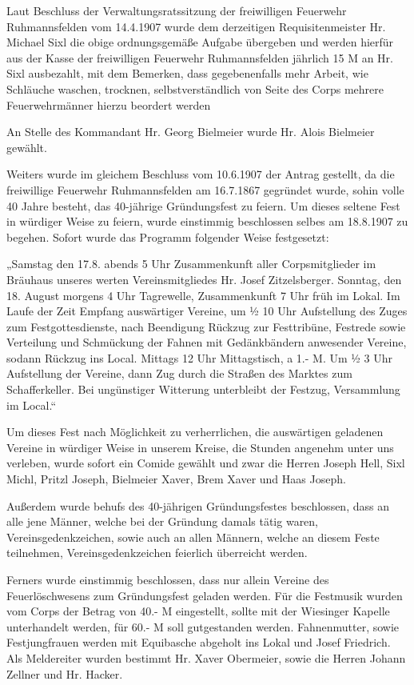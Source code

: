\documentclass[12pt,a4paper]{book}
\begin{document}
Laut Beschluss der Verwaltungsratssitzung der freiwilligen Feuerwehr
Ruhmannsfelden vom 14.4.1907 wurde dem derzeitigen Requisitenmeister Hr. Michael
Sixl die obige ordnungsgemäße Aufgabe übergeben und werden hierfür aus der Kasse
der freiwilligen Feuerwehr Ruhmannsfelden jährlich 15 M an Hr. Sixl ausbezahlt,
mit dem Bemerken, dass gegebenenfalls mehr Arbeit, wie Schläuche waschen,
trocknen, selbstverständlich von Seite des Corps mehrere Feuerwehrmänner hierzu
beordert werden

An Stelle des Kommandant Hr. Georg Bielmeier wurde Hr. Alois Bielmeier gewählt.

Weiters wurde im gleichem Beschluss vom 10.6.1907 der Antrag gestellt, da die
freiwillige Feuerwehr Ruhmannsfelden am 16.7.1867 gegründet wurde, sohin volle
40 Jahre besteht, das 40-jährige Gründungsfest zu feiern. Um dieses seltene Fest
in würdiger Weise zu feiern, wurde einstimmig beschlossen selbes am 18.8.1907 zu
begehen. Sofort wurde das Programm folgender Weise festgesetzt:

„Samstag den 17.8. abends 5 Uhr Zusammenkunft aller Corpsmitglieder im Bräuhaus
unseres werten Vereinsmitgliedes Hr. Josef Zitzelsberger. Sonntag, den 18.
August morgens 4 Uhr Tagrewelle, Zusammenkunft 7 Uhr früh im Lokal. Im Laufe der
Zeit Empfang auswärtiger Vereine, um ½ 10 Uhr Aufstellung des Zuges zum
Festgottesdienste, nach Beendigung Rückzug zur Festtribüne, Festrede sowie
Verteilung und Schmückung der Fahnen mit Gedänkbändern anwesender Vereine,
sodann Rückzug ins Local. Mittags 12 Uhr Mittagstisch, a 1.- M. Um ½ 3 Uhr
Aufstellung der Vereine, dann Zug durch die Straßen des Marktes zum
Schafferkeller. Bei ungünstiger Witterung unterbleibt der Festzug, Versammlung
im Local.“

Um dieses Fest nach Möglichkeit zu verherrlichen, die auswärtigen geladenen
Vereine in würdiger Weise in unserem Kreise, die Stunden angenehm unter uns
verleben, wurde sofort ein Comide gewählt und zwar die Herren Joseph Hell, Sixl
Michl, Pritzl Joseph, Bielmeier Xaver, Brem Xaver und Haas Joseph.

Außerdem wurde behufs des 40-jährigen Gründungsfestes beschlossen, dass an alle
jene Männer, welche bei der Gründung damals tätig waren, Vereinsgedenkzeichen,
sowie auch an allen Männern, welche an diesem Feste teilnehmen,
Vereinsgedenkzeichen feierlich überreicht werden.

Ferners wurde einstimmig beschlossen, dass nur allein Vereine des
Feuerlöschwesens zum Gründungsfest geladen werden. Für die Festmusik wurden vom
Corps der Betrag von 40.- M eingestellt, sollte mit der Wiesinger Kapelle
unterhandelt werden, für 60.- M soll gutgestanden werden. Fahnenmutter, sowie
Festjungfrauen werden mit Equibasche abgeholt ins Lokal und Josef Friedrich. Als
Meldereiter wurden bestimmt Hr. Xaver Obermeier, sowie die Herren Johann Zellner
und Hr. Hacker.
\end{document}
